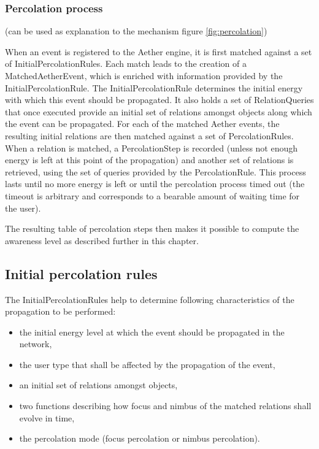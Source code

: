 \documentclass{ecscw2007}
\begin{document}
\subsubsection*{Percolation process}
(can be used as explanation to the mechanism figure \ref{fig:percolation})

When an event is registered to the Aether engine, it is first matched against a set of InitialPercolationRules. Each match leads to the creation of a MatchedAetherEvent, which is enriched with information provided by the InitialPercolationRule. The InitialPercolationRule determines the initial energy with which this event should be propagated. It also holds a set of RelationQueries that once executed provide an initial set of relations amongst objects along which the event can be propagated.
For each of the matched Aether events, the resulting initial relations are then matched against a set of PercolationRules. When a relation is matched, a PercolationStep is recorded (unless not enough energy is left at this point of the propagation) and another set of relations is retrieved, using the set of queries provided by the PercolationRule. This process lasts until no more energy is left or until the percolation process timed out (the timeout is arbitrary and corresponds to a bearable amount of waiting time for the user).

The resulting table of percolation steps then makes it possible to compute the awareness level as described further in this chapter.

\subsection*{Initial percolation rules}
The InitialPercolationRules help to determine following characteristics of the propagation to be performed:
\begin{itemize}
   \item the initial energy level at which the event should be propagated in the network,
   \item the user type that shall be affected by the propagation of the event,
   \item an initial set of relations amongst objects,
   \item two functions describing how focus and nimbus of the matched relations shall evolve in time,
   \item the percolation mode (focus percolation or nimbus percolation).
\end{itemize}
\end{document}
